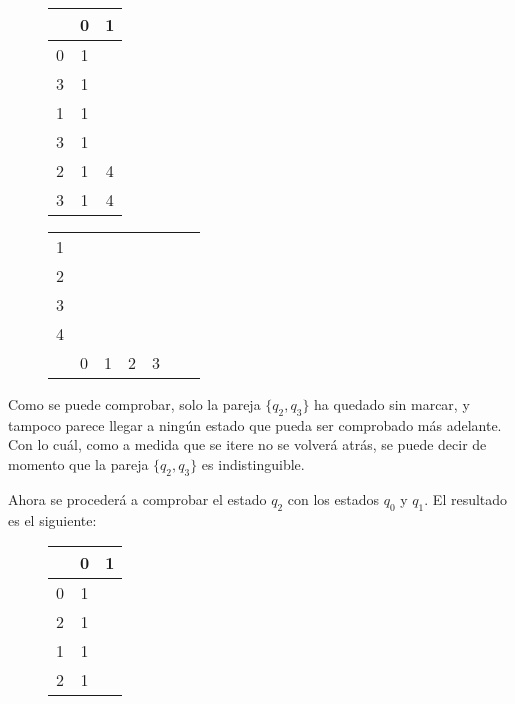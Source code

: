 \documentclass[11pt,a4paper]{article}
\begin{document}
		\begin{figure}[H]
			\centering
			\begin{tabular}{c|cc}
				& 0 & 1		\\ \hline
				0 & 1 & \color{red}{3}	\\
				3 & 1 & \color{red}{4}	\\ \hline
				1 & 1 & \color{red}{2}	\\ 
				3 & 1 & \color{red}{4}	\\ \hline
				2 & 1 & 4	\\
				3 & 1 & 4	\\ \hline				
			\end{tabular}
		\end{figure}
		
		\begin{figure}[H]
			\centering
			\begin{tabular}{*{7}{c|}}
																							\cline{2-2}
				1 & 																		\\ \cline{2-3}
				2 & &																		\\ \cline{2-4}
				3 & \color{red}{X} & \color{red}{X} &										\\ \cline{2-5}
				4 & \color{blue}{X} & \color{blue}{X} & \color{blue}{X} & \color{blue}{X}	\\ \cline{2-5}
				\multicolumn{0}{c}{} & \multicolumn{1}{c}{0} & \multicolumn{1}{c}{1} & \multicolumn{1}{c}{2}
				& \multicolumn{1}{c}{3}
			\end{tabular}
		\end{figure}
		
		Como se puede comprobar, solo la pareja $\lbrace q_2, q_3 \rbrace$ ha quedado sin marcar, y tampoco parece llegar
		a ningún estado que pueda ser comprobado más adelante. Con lo cuál, como a medida que se itere no se volverá atrás,
		se puede decir de momento que la pareja $\lbrace q_2, q_3 \rbrace$ es indistinguible. \par
		
		Ahora se procederá a comprobar el estado $q_2$ con los estados $q_0$ y $q_1$. El resultado es el siguiente:
		
		\begin{figure}[H]
			\centering
			\begin{tabular}{c|cc}
				& 0 & 1		\\ \hline
				0 & 1 & \color{red}{3}	\\
				2 & 1 & \color{red}{4}	\\ \hline
				1 & 1 & \color{red}{2}	\\ 
				2 & 1 & \color{red}{4}	\\ \hline				
			\end{tabular}
		\end{figure}
		
\end{document}
